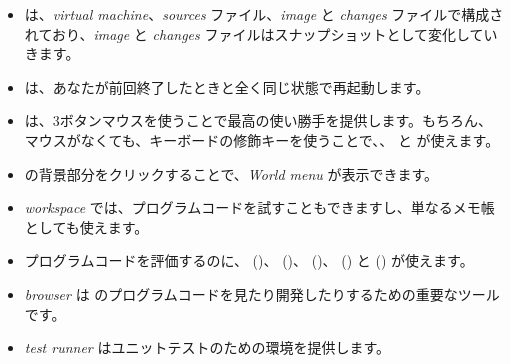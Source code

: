 \documentclass[a4paper,10pt,twoside]{book}
\begin{document}
\begin{itemize}
  \item \pharo は、\emph{virtual machine}、\emph{sources} ファイル、\emph{image} と \emph{changes} ファイルで構成されており、\emph{image} と \emph{changes} ファイルはスナップショットとして変化していきます。
  \item \pharo は、あなたが前回終了したときと全く同じ状態で再起動します。
  \item \pharo は、3ボタンマウスを使うことで最高の使い勝手を提供します。もちろん、マウスがなくても、キーボードの修飾キーを使うことで、\click 、 \actclick と \metaclick が使えます。
  \item \pharo の背景部分をクリックすることで、\emph{World menu} が表示できます。
  \item \emph{workspace} では、プログラムコードを試すこともできますし、単なるメモ帳としても使えます。
  \item プログラムコードを評価するのに、 ()、  ()、  ()、  () と  () が使えます。
  \item \emph{browser} は \pharo のプログラムコードを見たり開発したりするための重要なツールです。
  \item \emph{test runner} はユニットテストのための環境を提供します。
\end{itemize}

\ifx\wholebook\relax\else 
   
   
\end{document}
